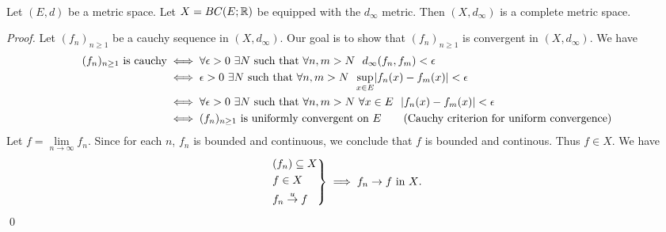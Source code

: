 \begin{theorem}[$BC(E; \R)$ is Complete] \leavevmode \\
    Let $(E,d)$ be a metric space. Let $X = BC(E; \mathbb{R})$ be equipped with the $d_\infty$ metric. Then $(X, d_\infty)$ is a complete metric space.
\end{theorem}
\begin{proof}
    Let $(f_n)_{n\geq 1}$ be a cauchy sequence in $(X, d_\infty)$. Our goal is to show that $(f_n)_{n\geq 1}$ is convergent in $(X, d_\infty)$. We have
    \begin{align*}
        (f_n)_{n\geq 1} \text{ is cauchy} &\iff \forall \epsilon > 0 ~\exists N \text{ such that } \forall n,m > N ~~d_\infty(f_n,f_m) < \epsilon \\
        &\iff \epsilon > 0 ~\exists N \text{ such that } \forall n , m > N ~~\underset{x\in E}{\sup} |f_n(x) - f_m(x)| < \epsilon \\
        &\iff \forall \epsilon > 0 ~\exists N \text{ such that } \forall n,m > N ~\forall x \in E ~~|f_n(x) - f_m(x)| < \epsilon \\
        &\iff (f_n)_{n\geq 1} \text{ is uniformly convergent on $E$} \tag{Cauchy criterion for uniform convergence}
    \end{align*}
    Let $f = \lim \limits_{n\to \infty}f_n.$ Since for each $n$, $f_n$ is bounded and continuous, we conclude that $f$ is bounded and continous. Thus $f \in X.$ We have 
    \[
        \begin{rcases*}
            (f_n) \subseteq X \\
            f \in X \\
            f_n \overset{u}{\to} f
        \end{rcases*} \implies f_n \to f \text{ in $X$.}
    \]
    \qed
\end{proof}